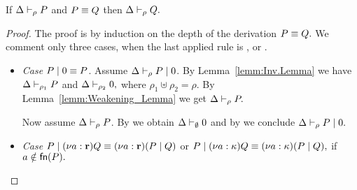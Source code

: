 \begin{lemma}\label{lemm:Subject_congruence}
If $ \Delta\vdash_\rho P$ and $P\equiv Q$ then $ \Delta\vdash_\rho Q.$
\end{lemma}
\begin{proof}
The proof is by induction on the depth of the derivation $P\equiv Q.$ We comment only three cases, when the last applied rule is ,  or .
\begin{itemize}
\item \emph{Case} $P\;|\;0\equiv P$. Assume $ \Delta\vdash_\rho P\;|\;0$. By Lemma~\ref{lemm:Inv.Lemma} we have $ \Delta\vdash_{\rho_1} P $ and $ \Delta\vdash_{\rho_2} 0,$ where $\rho_1 \uplus\rho_2=\rho.$ By Lemma~\ref{lemm:Weakening_Lemma} we get $ \Delta\vdash_\rho P.$

Now assume $ \Delta\vdash_\rho P$. By  we obtain $ \Delta\vdash_\emptyset 0$ and by  we conclude $ \Delta\vdash_\rho P\;|\;0.$

\item \emph{Case} $P\;|\; (\nu a: {\mathbf{r}})Q \equiv (\nu a: {\mathbf{r}})(P\;|\;Q)$ or $P\;|\; (\nu a: {\mathbf{\kappa}})Q \equiv (\nu a: {\mathbf{\kappa}})(P\;|\;Q),$ if $a\notin\mathsf{fn}(P).$ 


\end{itemize}
\end{proof}

